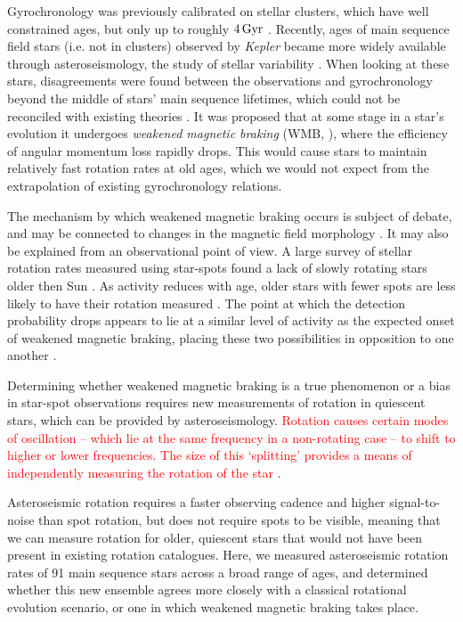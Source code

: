 \documentclass[12pt]{article}
\newcommand{\kepler}{\emph{Kepler}\xspace}
\newcommand{\rtwo}[1]{\textcolor{red}{{#1}}}
\begin{document}
Gyrochronology was previously calibrated on stellar clusters, which have well constrained ages, but only up to roughly $4\, \rm{Gyr}$ \cite{meibom+2015, barnes+2016}. Recently, ages of main sequence field stars (i.e. not in clusters) observed by \kepler \cite{borucki+2010} became more widely available through asteroseismology, the study of stellar variability \cite{silvaaguirre+2015}. When looking at these stars, disagreements were found between the observations and gyrochronology beyond the middle of stars' main sequence lifetimes, which could not be reconciled with existing theories \cite{angus+2015, nielsen+2015, davies+2015}. It was proposed that at some stage in a star's evolution it undergoes \textit{weakened magnetic braking} (WMB, \cite{vansaders+2016}), where the efficiency of angular momentum loss rapidly drops. This would cause stars to maintain relatively fast rotation rates at old ages, which we would not expect from the extrapolation of existing gyrochronology relations.

The mechanism by which weakened magnetic braking occurs is subject of debate, and may be connected to changes in the magnetic field morphology \cite{vansaders+2016,reville+2015,garraffo+2016, metcalfe+2016, metcalfe+2019, see+2019}. It may also be explained from an observational point of view. A large survey of stellar rotation rates measured using star-spots found a lack of slowly rotating stars older then Sun \cite{mcquillan+2014}. As activity reduces with age, older stars with fewer spots are less likely to have their rotation measured \cite{matt+2015, reinhold+2020}. The point at which the detection probability drops appears to lie at a similar level of activity as the expected onset of weakened magnetic braking, placing these two possibilities in opposition to one another \cite{vansaders+2019}.

Determining whether weakened magnetic braking is a true phenomenon or a bias in star-spot observations requires new measurements of rotation in quiescent stars, which can be provided by asteroseismology. \rtwo{Rotation causes certain modes of oscillation -- which lie at the same frequency in a non-rotating case -- to shift to higher or lower frequencies. The size of this `splitting' provides a means of independently measuring the rotation of the star \cite{ledoux1951}}. 

Asteroseismic rotation requires a faster observing cadence and higher signal-to-noise than spot rotation, but does not require spots to be visible, meaning that we can measure rotation for older, quiescent stars that would not have been present in existing rotation catalogues. 
Here, we measured asteroseismic rotation rates of 91 main sequence stars across a broad range of  ages, and determined whether this new ensemble agrees more closely with a classical rotational evolution scenario, or one in which weakened magnetic braking takes place.\\
\end{document}
